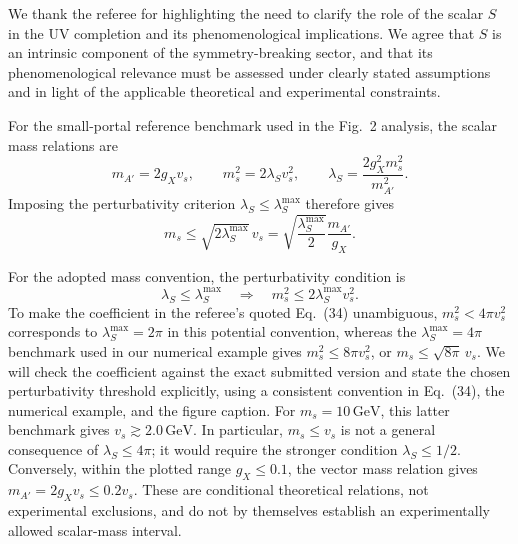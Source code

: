 \documentclass[12pt,a4paper]{article}
\begin{document}
We thank the referee for highlighting the need to clarify the role of the scalar \(S\) in the UV completion and its phenomenological implications. We agree that \(S\) is an intrinsic component of the symmetry-breaking sector, and that its phenomenological relevance must be assessed under clearly stated assumptions and in light of the applicable theoretical and experimental constraints.

For the small-portal reference benchmark used in the Fig.~2 analysis, the scalar mass relations are
\[
m_{A'}=2g_Xv_s,\qquad m_s^2=2\lambda_Sv_s^2,
\qquad
\lambda_S=\frac{2g_X^2m_s^2}{m_{A'}^2}.
\]
Imposing the perturbativity criterion \(\lambda_S\leq\lambda_S^{\max}\) therefore gives
\[
m_s\leq\sqrt{2\lambda_S^{\max}}\,v_s
=\sqrt{\frac{\lambda_S^{\max}}{2}}\frac{m_{A'}}{g_X}.
\]

For the adopted mass convention, the perturbativity condition is
\[
\lambda_S\leq\lambda_S^{\max}
\quad\Longrightarrow\quad
m_s^2\leq 2\lambda_S^{\max}v_s^2.
\]
To make the coefficient in the referee's quoted Eq.~(34) unambiguous, \(m_s^2<4\pi v_s^2\) corresponds to \(\lambda_S^{\max}=2\pi\) in this potential convention, whereas the \(\lambda_S^{\max}=4\pi\) benchmark used in our numerical example gives \(m_s^2\leq8\pi v_s^2\), or \(m_s\leq\sqrt{8\pi}\,v_s\). We will check the coefficient against the exact submitted version and state the chosen perturbativity threshold explicitly, using a consistent convention in Eq.~(34), the numerical example, and the figure caption. For \(m_s=10\,\mathrm{GeV}\), this latter benchmark gives \(v_s\gtrsim2.0\,\mathrm{GeV}\). In particular, \(m_s\leq v_s\) is not a general consequence of \(\lambda_S\leq4\pi\); it would require the stronger condition \(\lambda_S\leq1/2\). Conversely, within the plotted range \(g_X\leq0.1\), the vector mass relation gives \(m_{A'}=2g_Xv_s\leq0.2v_s\). These are conditional theoretical relations, not experimental exclusions, and do not by themselves establish an experimentally allowed scalar-mass interval.
\end{document}
